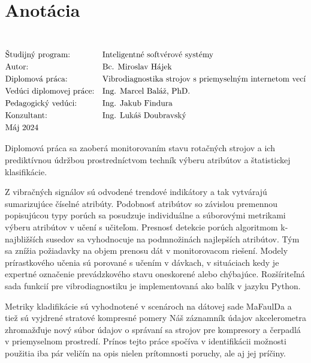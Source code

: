 \section*{Anotácia}
\University \\
\uppercase{\Faculty}
\vspace{-8pt}
{\setlength{\mathindent}{0cm}
\begin{align*}
&\text{Študijný program:} && \text{\StudyProgramme} \\
&\text{Autor:} && \text{\Author} \\
&\text{\Thesis:} && \text{\Title} \\
&\text{Vedúci diplomovej práce:} && \text{\Supervisor} \\
&\text{Pedagogický vedúci:} && \text{\DepartmentalAdvisor} \\
&\text{Konzultant:} && \text{\Consultant} \\
&\text{\Date}
\end{align*}}

Diplomová práca sa zaoberá monitorovaním stavu rotačných strojov a ich prediktívnou údržbou prostredníctvom techník výberu atribútov a štatistickej klasifikácie.

Z vibračných signálov sú odvodené trendové indikátory a tak vytvárajú sumarizujúce číselné atribúty. Podobnosť atribútov so závislou premennou popisujúcou typy porúch sa posudzuje individuálne a súborovými metrikami výberu atribútov v učení s učiteľom.  Presnosť detekcie porúch algoritmom k-najbližších susedov sa vyhodnocuje na podmnožinách najlepších atribútov. Tým sa znížia požiadavky na objem prenosu dát v monitorovacom riešení. Modely prírastkového učenia sú porované s učením v dávkach, v situáciach kedy je expertné označenie prevádzkového stavu oneskorené alebo chýbajúce. Rozšíriteľná sada funkcií pre vibrodiagnostiku je implementovaná ako balík v jazyku Python.

Metriky kladifikácie sú vyhodnotené v scenároch na dátovej sade MaFaulDa a tiež sú vyjdrené stratové kompresné pomery Náš záznamník údajov akcelerometra zhromažďuje nový súbor údajov o správaní sa strojov pre kompresory a čerpadlá v priemyselnom prostredí. Prínos tejto práce spočíva v identifikácii možnosti použitia iba pár veličín na opis nielen prítomnosti poruchy, ale aj jej príčiny.
\emptypage

